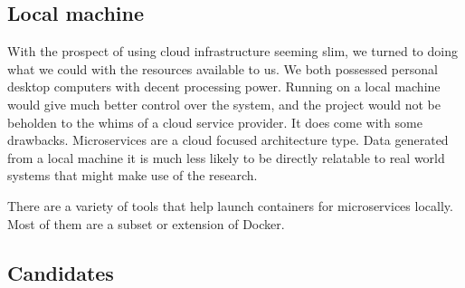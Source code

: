 \subsection{Local machine}
With the prospect of using cloud infrastructure seeming slim, we turned to doing what we could with the resources available to us. We both possessed personal desktop computers with decent processing power. 
Running on a local machine would give much better control over the system, and the project would not be beholden to the whims of a cloud service provider. 
It does come with some drawbacks. Microservices are a cloud focused architecture type. Data generated from a local machine it is much less likely to be directly relatable to real world systems that might make use of the research.

There are a variety of tools that help launch containers for microservices locally. Most of them are a subset or extension of Docker. 

\subsection{Candidates}
